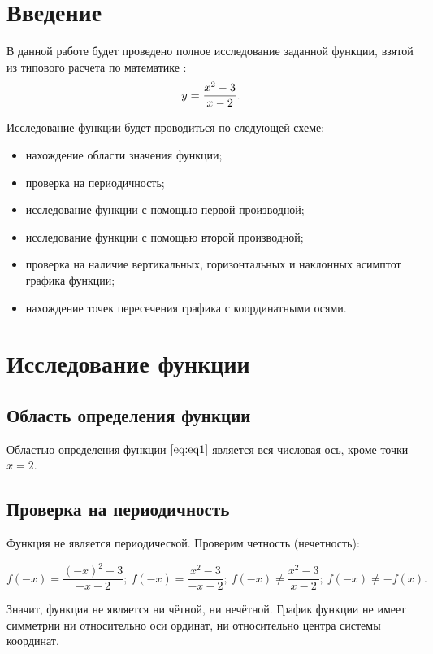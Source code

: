 \section*{Введение}

В данной работе будет проведено полное исследование заданной функции, взятой из типового расчета по математике \cite{tip}: 
\begin{equation}
    \centering
    \label{eq:eq1}
    y = \frac{x^2-3}{x-2}.
\end{equation}

 Исследование функции будет проводиться по следующей схеме:
\begin{itemize}
    \item нахождение области значения функции;
    \item проверка на периодичность;
    \item исследование функции с помощью первой производной;
    \item исследование функции с помощью второй производной;
    \item проверка на наличие вертикальных, горизонтальных и наклонных асимптот графика функции;
    \item нахождение точек пересечения графика с координатными осями.
\end{itemize}


\newpage
\section{Исследование функции}

\subsection{Область определения функции}

Областью определения функции $\eqref{eq:eq1}$ является вся числовая ось, кроме точки $x = 2$.

\subsection{Проверка на периодичность}

Функция не является периодической. Проверим четность (нечетность):

\[f(-x) = \frac{(-x)^2-3}{-x-2} ;\ f(-x) = \frac{x^2-3}{-x-2} ;\ f(-x) \neq \frac{x^2-3}{x-2} ;\ f(-x) \neq -f(x).\]

Значит, функция не является ни чётной, ни нечётной. График функции не
имеет симметрии ни относительно оси ординат, ни относительно центра
системы координат.


